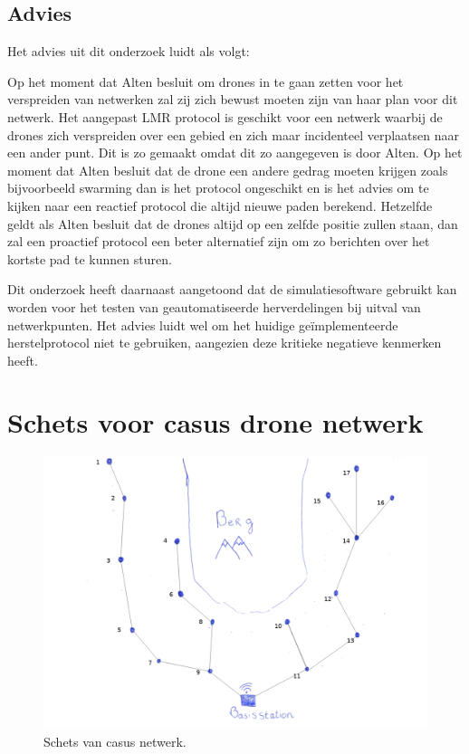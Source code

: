 \documentclass[a4paper, 11pt, oneside]{report}
\begin{document}
\section{Advies}
Het advies uit dit onderzoek luidt als volgt:

Op het moment dat Alten besluit om drones in te gaan zetten voor het verspreiden van netwerken zal zij zich bewust moeten zijn van haar plan voor dit netwerk.
Het aangepast LMR protocol is geschikt voor een netwerk waarbij de drones zich verspreiden over een gebied en zich maar incidenteel verplaatsen naar een ander punt.
Dit is zo gemaakt omdat dit zo aangegeven is door Alten.
Op het moment dat Alten besluit dat de drone een andere gedrag moeten krijgen zoals bijvoorbeeld swarming dan is het protocol ongeschikt en is het advies om te kijken naar een reactief protocol die altijd nieuwe paden berekend.
Hetzelfde geldt als Alten besluit dat de drones altijd op een zelfde positie zullen staan, dan zal een proactief protocol een beter alternatief zijn om zo berichten over het kortste pad te kunnen sturen.    

Dit onderzoek heeft daarnaast aangetoond dat de simulatiesoftware gebruikt kan worden voor het testen van geautomatiseerde herverdelingen bij uitval van netwerkpunten. Het advies luidt wel om het huidige geïmplementeerde herstelprotocol niet te gebruiken, aangezien deze kritieke negatieve kenmerken heeft. 




\clearpage
\appendix
\chapter{Schets voor casus drone netwerk}
 \label{app:schetsNetwerk}
\begin{figure}[H]
	\begin{center}\includegraphics[width=\linewidth]{schetsNetwerk}\end{center}
	\caption{Schets van casus netwerk.}
	\label{fig:schetsNetwerk}
\end{figure}
\end{document}
